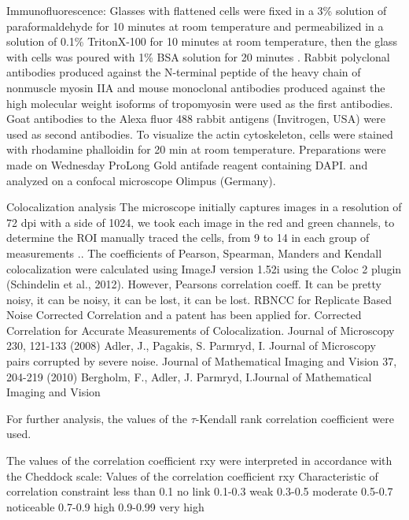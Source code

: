 \documentclass[a4paper,12pt]{article}
\begin{document}
Immunofluorescence:
Glasses with flattened cells were fixed in a 3\% solution of paraformaldehyde for 10 minutes at room temperature and permeabilized in a solution of 0.1\% TritonX-100 for 10 minutes at room temperature, then the glass with cells was poured with 1\% BSA solution for 20 minutes . Rabbit polyclonal antibodies produced against the N-terminal peptide of the heavy chain of nonmuscle myosin IIA and mouse monoclonal antibodies produced against the high molecular weight isoforms of tropomyosin were used as the first antibodies. Goat antibodies to the Alexa fluor 488 rabbit antigens (Invitrogen, USA) were used as second antibodies. To visualize the actin cytoskeleton, cells were stained with rhodamine phalloidin for 20 min at room temperature. Preparations were made on Wednesday ProLong Gold antifade reagent containing DAPI. and analyzed on a confocal microscope Olimpus (Germany).

Colocalization analysis
The microscope initially captures images in a resolution of 72 dpi with a side of 1024, we took each image in the red and green channels, to determine the ROI manually traced the cells, from 9 to 14 in each group of measurements ..
The coefficients of Pearson, Spearman, Manders and Kendall colocalization were calculated using ImageJ version 1.52i using the Coloc 2 plugin (Schindelin et al., 2012).
However, Pearsons correlation coeff. It can be pretty noisy, it can be noisy, it can be lost, it can be lost. RBNCC for Replicate Based Noise Corrected Correlation and a patent has been applied for. Corrected Correlation for Accurate Measurements of Colocalization. Journal of Microscopy 230, 121-133 (2008) Adler, J., Pagakis, S.  Parmryd, I. Journal of Microscopy pairs corrupted by severe noise.
Journal of Mathematical Imaging and Vision 37, 204-219 (2010) Bergholm, F., Adler, J.  Parmryd, I.Journal of Mathematical Imaging and Vision


For further analysis,
the values of
the $\tau$-Kendall rank correlation coefficient
 were used.


The values of the correlation coefficient rxy were interpreted in accordance with the Cheddock scale:
Values of the correlation coefficient rxy Characteristic of correlation constraint
less than 0.1 no link
0.1-0.3 weak
0.3-0.5 moderate
0.5-0.7 noticeable
0.7-0.9 high
0.9-0.99 very high
\cite{tinevez2017trackmate}
\end{document}
